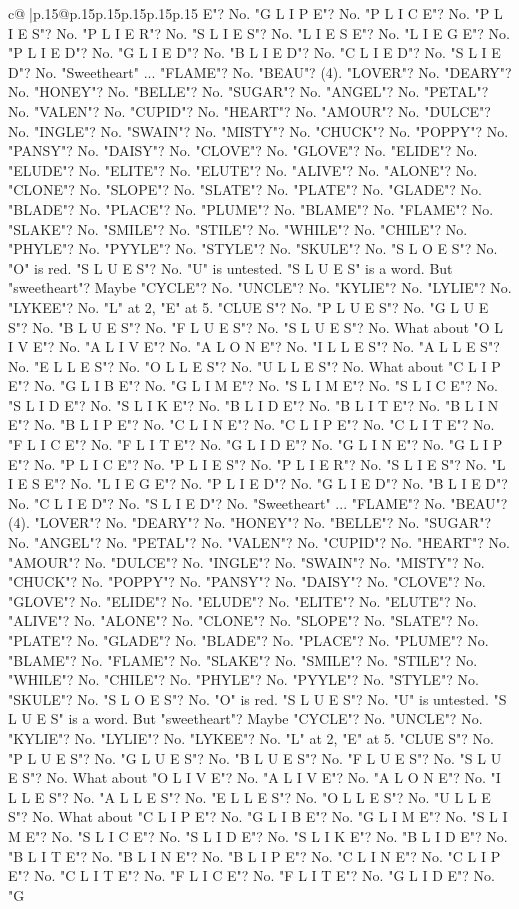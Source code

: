\documentclass{article}
\begin{document}
{\begin{supertabular}{c@{$\;$}|p{.15\linewidth}@{}p{.15\linewidth}p{.15\linewidth}p{.15\linewidth}p{.15\linewidth}p{.15\linewidth}}
{{{E"? No. "G L I P E"? No. "P L I C E"? No. "P L I E S"? No. "P L I E R"? No. "S L I E S"? No. "L I E S E"? No. "L I E G E"? No. "P L I E D"? No. "G L I E D"? No. "B L I E D"? No. "C L I E D"? No. "S L I E D"? No. "Sweetheart" ... "FLAME"? No. "BEAU"? (4). "LOVER"? No. "DEARY"? No. "HONEY"? No. "BELLE"? No. "SUGAR"? No. "ANGEL"? No. "PETAL"? No. "VALEN"? No. "CUPID"? No. "HEART"? No. "AMOUR"? No. "DULCE"? No. "INGLE"? No. "SWAIN"? No. "MISTY"? No. "CHUCK"? No. "POPPY"? No. "PANSY"? No. "DAISY"? No. "CLOVE"? No. "GLOVE"? No. "ELIDE"? No. "ELUDE"? No. "ELITE"? No. "ELUTE"? No. "ALIVE"? No. "ALONE"? No. "CLONE"? No. "SLOPE"? No. "SLATE"? No. "PLATE"? No. "GLADE"? No. "BLADE"? No. "PLACE"? No. "PLUME"? No. "BLAME"? No. "FLAME"? No. "SLAKE"? No. "SMILE"? No. "STILE"? No. "WHILE"? No. "CHILE"? No. "PHYLE"? No. "PYYLE"? No. "STYLE"? No. "SKULE"? No. "S L O E S"? No. "O" is red. "S L U E S"? No. "U" is untested. "S L U E S" is a word. But "sweetheart"? Maybe "CYCLE"? No. "UNCLE"? No. "KYLIE"? No. "LYLIE"? No. "LYKEE"? No. "L" at 2, "E" at 5. "CLUE S"? No. "P L U E S"? No. "G L U E S"? No. "B L U E S"? No. "F L U E S"? No. "S L U E S"? No. What about "O L I V E"? No. "A L I V E"? No. "A L O N E"? No. "I L L E S"? No. "A L L E S"? No. "E L L E S"? No. "O L L E S"? No. "U L L E S"? No. What about "C L I P E"? No. "G L I B E"? No. "G L I M E"? No. "S L I M E"? No. "S L I C E"? No. "S L I D E"? No. "S L I K E"? No. "B L I D E"? No. "B L I T E"? No. "B L I N E"? No. "B L I P E"? No. "C L I N E"? No. "C L I P E"? No. "C L I T E"? No. "F L I C E"? No. "F L I T E"? No. "G L I D E"? No. "G L I N E"? No. "G L I P E"? No. "P L I C E"? No. "P L I E S"? No. "P L I E R"? No. "S L I E S"? No. "L I E S E"? No. "L I E G E"? No. "P L I E D"? No. "G L I E D"? No. "B L I E D"? No. "C L I E D"? No. "S L I E D"? No. "Sweetheart" ... "FLAME"? No. "BEAU"? (4). "LOVER"? No. "DEARY"? No. "HONEY"? No. "BELLE"? No. "SUGAR"? No. "ANGEL"? No. "PETAL"? No. "VALEN"? No. "CUPID"? No. "HEART"? No. "AMOUR"? No. "DULCE"? No. "INGLE"? No. "SWAIN"? No. "MISTY"? No. "CHUCK"? No. "POPPY"? No. "PANSY"? No. "DAISY"? No. "CLOVE"? No. "GLOVE"? No. "ELIDE"? No. "ELUDE"? No. "ELITE"? No. "ELUTE"? No. "ALIVE"? No. "ALONE"? No. "CLONE"? No. "SLOPE"? No. "SLATE"? No. "PLATE"? No. "GLADE"? No. "BLADE"? No. "PLACE"? No. "PLUME"? No. "BLAME"? No. "FLAME"? No. "SLAKE"? No. "SMILE"? No. "STILE"? No. "WHILE"? No. "CHILE"? No. "PHYLE"? No. "PYYLE"? No. "STYLE"? No. "SKULE"? No. "S L O E S"? No. "O" is red. "S L U E S"? No. "U" is untested. "S L U E S" is a word. But "sweetheart"? Maybe "CYCLE"? No. "UNCLE"? No. "KYLIE"? No. "LYLIE"? No. "LYKEE"? No. "L" at 2, "E" at 5. "CLUE S"? No. "P L U E S"? No. "G L U E S"? No. "B L U E S"? No. "F L U E S"? No. "S L U E S"? No. What about "O L I V E"? No. "A L I V E"? No. "A L O N E"? No. "I L L E S"? No. "A L L E S"? No. "E L L E S"? No. "O L L E S"? No. "U L L E S"? No. What about "C L I P E"? No. "G L I B E"? No. "G L I M E"? No. "S L I M E"? No. "S L I C E"? No. "S L I D E"? No. "S L I K E"? No. "B L I D E"? No. "B L I T E"? No. "B L I N E"? No. "B L I P E"? No. "C L I N E"? No. "C L I P E"? No. "C L I T E"? No. "F L I C E"? No. "F L I T E"? No. "G L I D E"? No. "G }}}
\end{supertabular}}
\end{document}
